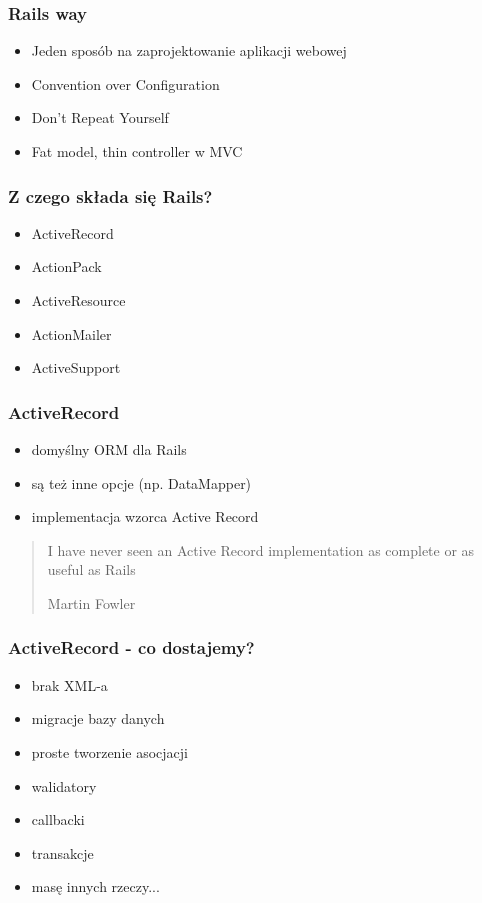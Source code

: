 \documentclass[12t]{beamer}
\begin{document}
\begin{frame}
  \frametitle{Rails way}
  \begin{itemize}
  \item Jeden sposób na zaprojektowanie aplikacji webowej
  \item Convention over Configuration
  \item Don't Repeat Yourself
  \item Fat model, thin controller w MVC
  \end{itemize}
\end{frame}

\begin{frame}
  \frametitle{Z czego składa się Rails?}
  \begin{itemize}
  \item ActiveRecord
  \item ActionPack
  \item ActiveResource
  \item ActionMailer
  \item ActiveSupport
  \end{itemize}
\end{frame}

\begin{frame}
  \frametitle{ActiveRecord}
  \begin{itemize}
  \item domyślny ORM dla Rails
  \item są też inne opcje (np. DataMapper)
  \item implementacja wzorca Active Record
  \end{itemize}
\end{frame}

\begin{frame}
  \begin{quote}
    I have never seen an Active Record implementation as complete or as useful as Rails

    \hfill Martin Fowler
  \end{quote}
\end{frame}

\begin{frame}
  \frametitle{ActiveRecord - co dostajemy?}
  \begin{itemize}
  \item brak XML-a
  \item migracje bazy danych
  \item proste tworzenie asocjacji
  \item walidatory
  \item callbacki
  \item transakcje
  \item masę innych rzeczy...
  \end{itemize}
\end{frame}
\end{document}

